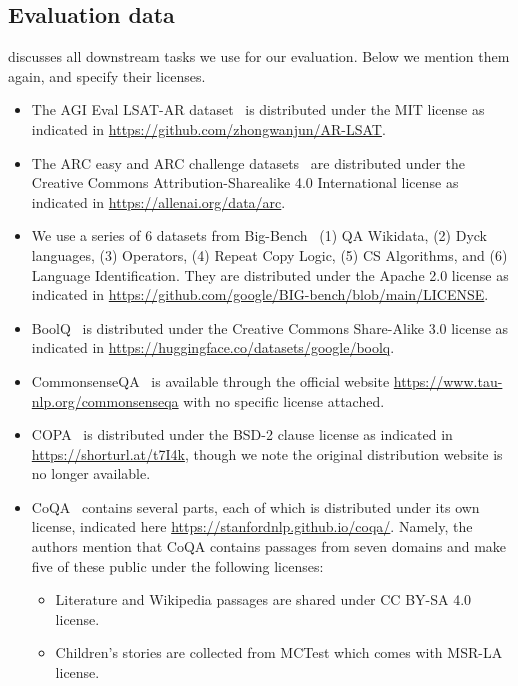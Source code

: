 \documentclass{article}
\begin{document}
\subsection{Evaluation data}
 discusses all downstream tasks we use for our evaluation.
Below we mention them again, and specify their licenses.
\begin{itemize}
    \item
    The AGI Eval LSAT-AR dataset~\citep{zhong2023agieval} is distributed under the MIT license as indicated in \url{https://github.com/zhongwanjun/AR-LSAT}.
    \item
    The ARC easy and ARC challenge datasets~\citep{arc} are distributed under the Creative Commons Attribution-Sharealike 4.0 International license as indicated in \url{https://allenai.org/data/arc}.
    \item
    We use a series of 6 datasets from Big-Bench~\citep{srivastava2023beyond} (1) QA Wikidata, (2) Dyck languages, (3) Operators, (4) Repeat Copy Logic, (5) CS Algorithms, and (6) Language Identification. They are distributed under the Apache 2.0 license as indicated in \url{https://github.com/google/BIG-bench/blob/main/LICENSE}.
    \item
    BoolQ~\citep{boolq} is distributed under the  Creative Commons Share-Alike 3.0 license as indicated in \url{https://huggingface.co/datasets/google/boolq}.
    \item
    CommonsenseQA~\citep{talmor-etal-2019-commonsenseqa}  is available through the official website \url{https://www.tau-nlp.org/commonsenseqa} with no specific license attached.
    \item
    COPA~\citep{copa} is distributed under the BSD-2 clause license as indicated in \url{https://shorturl.at/t7I4k}, though we note the original distribution website is no longer available.
    \item
    CoQA~\citep{reddy-etal-2019-coqa} contains several parts, each of which is distributed under its own license, indicated here \url{https://stanfordnlp.github.io/coqa/}. Namely, the authors mention that CoQA contains passages from seven domains and make five of these public under the following licenses:
        \begin{itemize}
        \item Literature and Wikipedia passages are shared under CC BY-SA 4.0 license.
        \item Children's stories are collected from MCTest which comes with MSR-LA license.

\end{itemize}
\end{itemize}
\end{document}
